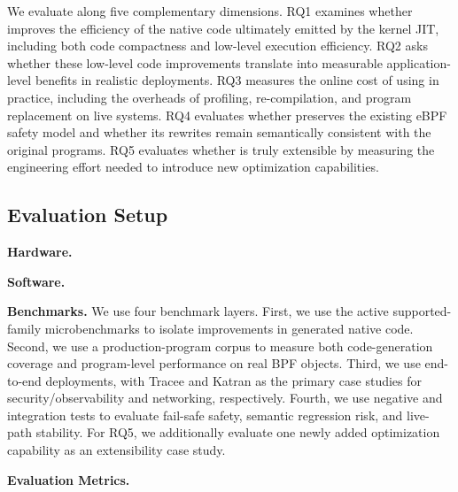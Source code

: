 We evaluate \tool along five complementary dimensions. 
%
RQ1 examines whether \tool improves the efficiency of the native code ultimately emitted by the kernel JIT, including both code compactness and low-level execution efficiency.
%
RQ2 asks whether these low-level code improvements translate into measurable application-level benefits in realistic deployments.
%
RQ3 measures the online cost of using \tool in practice, including the overheads of profiling, re-compilation, and program replacement on live systems.
%
RQ4 evaluates whether \tool preserves the existing eBPF safety model and whether its rewrites remain semantically consistent with the original programs.
%
RQ5 evaluates whether \tool is truly extensible by measuring the engineering effort needed to introduce new optimization capabilities.



\subsection{Evaluation Setup}
\label{subsec:evaluation-setup}

\noindent\textbf{Hardware.}


\noindent\textbf{Software.}


\noindent\textbf{Benchmarks.}
%
We use four benchmark layers. First, we use the active supported-family microbenchmarks to isolate improvements in generated native code. Second, we use a production-program corpus to measure both code-generation coverage and program-level performance on real BPF objects. Third, we use end-to-end deployments, with Tracee and Katran as the primary case studies for security/observability and networking, respectively. Fourth, we use negative and integration tests to evaluate fail-safe safety, semantic regression risk, and live-path stability. For RQ5, we additionally evaluate one newly added optimization capability as an extensibility case study.

\noindent\textbf{Evaluation Metrics.}
%

